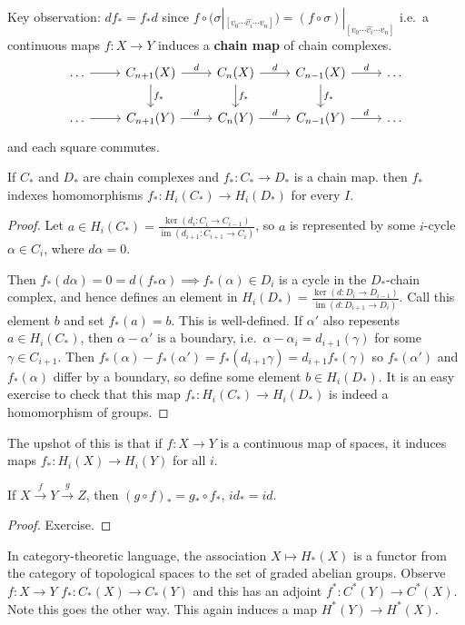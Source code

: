 \documentclass{article}
\DeclareMathOperator{\im}{im}
\begin{document}
Key observation: $df_* = f_*d$ since $f \circ (\sigma|_{[v_0 \dotsm \hat{v_i} \dotsm v_n]}) = (f \circ \sigma)|_{[v_0 \dotsm \hat{v_i} \dotsm v_n]}$
i.e.\ a continuous maps $f: X \to Y$ induces a \textbf{chain map} of chain complexes.
\begin{equation*}
  \begin{tikzcd}
    \dots \rar & C_{n+1}(X) \rar{d} \dar{f_*} & C_n(X) \rar{d} \dar{f_*} & C_{n-1}(X) \rar{d} \dar{f_*} & \dots \\
    \dots \rar & C_{n+1}(Y) \rar{d}  & C_n(Y) \rar{d}  & C_{n-1}(Y) \rar{d}  & \dots
  \end{tikzcd}
\end{equation*}
and each square commutes.
\begin{lemma}
  If $C_*$ and $D_*$ are chain complexes and $f_*:C_* \to D_*$ is a chain map. then $f_*$ indexes homomorphisms $f_*:H_i(C_*) \to H_i(D_*)$ for every $I$.
\end{lemma}
\begin{proof}
  Let $a \in H_i(C_*) = \frac{\ker(d_i:C_i \to C_{i-1})}{\im(d_{i+1}:C_{i+1} \to C_i)}$, so $a$ is represented by some $i$-cycle $\alpha \in C_i$, where $d \alpha = 0$.

  Then $f_*(d\alpha) = 0 = d(f_* \alpha) \implies f_*(\alpha) \in D_i$ is a cycle in the $D_*$-chain complex, and hence defines an element in $H_i(D_*) = \frac{\ker(d:D_i \to D_{i-1})}{\im(d:D_{i+1}\to D_i)}$. Call this element $b$ and set $f_*(a) = b$.
  This is well-defined.
  If $\alpha'$ also repesents $a \in H_i(C_*)$, then $\alpha-\alpha'$ is a boundary, i.e.\ $\alpha-\alpha_i = d_{i+1}(\gamma)$ for some $\gamma \in C_{i+1}$.
  Then $f_*(\alpha) - f_*(\alpha') = f_*(d_{i+1}\gamma) = d_{i+1} f_*(\gamma)$ so $f_*(\alpha')$ and $f_*(\alpha)$ differ by a boundary, so define some element $b \in H_i(D_*)$.
  It is an easy exercise to check that this map $f_*:H_i(C_*) \to H_i(D_*)$ is indeed a homomorphism of groups.
\end{proof}
The upshot of this is that if $f:X\to Y$ is a continuous map of spaces, it induces maps $f_*:H_i(X) \to H_i(Y)$ for all $i$.
\begin{lemma}
  If $X \xrightarrow{f} Y \xrightarrow{g} Z$, then $(g \circ f)_* = g_* \circ f_*$, $id_* = id$.
\end{lemma}
\begin{proof}
  Exercise.
\end{proof}
In category-theoretic language, the association $X \mapsto H_*(X)$ is a functor from the category of topological spaces to the set of graded abelian groups.
Observe $f:X \to Y$ $f_*:C_*(X) \to C_*(Y)$ and this has an adjoint $f^*: C^*(Y) \to C^*(X)$.
Note this goes the other way. This again induces a map $H^*(Y) \to H^*(X)$.
\end{document}
